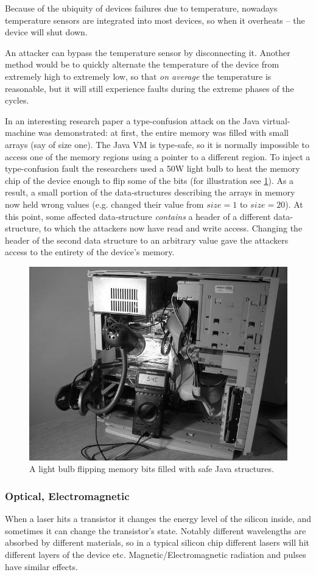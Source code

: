 Because of the ubiquity of devices failures due to temperature, nowadays temperature sensors are integrated into most devices, so when it overheats -- the device will shut down.

An attacker can bypass the temperature sensor by disconnecting it. Another method would be to quickly alternate the temperature of the device from extremely high to extremely low, so that \emph{on average} the temperature is reasonable, but it will still experience faults during the extreme phases of the cycles.

In an interesting research paper \cite{appel} a type-confusion attack on the Java virtual-machine was demonstrated: at first, the entire memory was filled with small arrays (say of size one). The Java VM is type-safe, so it is normally impossible to access one of the memory regions using a pointer to a different region. To inject a type-confusion fault the researchers used a 50W light bulb to heat the memory chip of the device enough to flip some of the bits (for illustration see \cref{fig:memory_lightbulb}). As a result, a small portion of the data-structures describing the arrays in memory now held wrong values (e.g. changed their value from $size=1$ to $size=20$). At this point, some affected data-structure \emph{contains} a header of a different data-structure, to which the attackers now have read and write access. Changing the header of the second data structure to an arbitrary value gave the attackers access to the entirety of the device's memory.
\begin{figure}[!ht]
	\centering
	\includegraphics[width=0.7\linewidth]{images/ch9/bulb.png}
	\caption{A light bulb flipping memory bits filled with safe Java structures.}
	\label{fig:memory_lightbulb}
\end{figure}

\subsubsection{Optical, Electromagnetic} \label{subsubsec:optical_electromagnetic}
When a laser hits a transistor it changes the energy level of the silicon inside, and sometimes it can change the transistor's state. Notably different wavelengths are absorbed by different materials, so in a typical silicon chip different lasers will hit different layers of the device etc. Magnetic/Electromagnetic radiation and pulses have similar effects.

